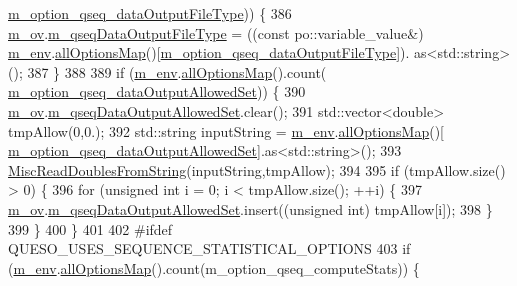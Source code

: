 \begin{DoxyCode}
      \hyperlink{class_q_u_e_s_o_1_1_monte_carlo_s_g_options_a7e07046865a2e99b61ac30b94dfc8306}{m\_option\_qseq\_dataOutputFileType})) \{
386     \hyperlink{class_q_u_e_s_o_1_1_monte_carlo_s_g_options_a4bc6849a41ede87425cad9ab6e97df11}{m\_ov}.\hyperlink{class_q_u_e_s_o_1_1_mc_options_values_a4816ea4c0aef22cc5d2e9057ea44b73e}{m\_qseqDataOutputFileType} = ((\textcolor{keyword}{const} po::variable\_value&) 
      \hyperlink{class_q_u_e_s_o_1_1_monte_carlo_s_g_options_a16b93142f6a249ccf1d07de964fec2ef}{m\_env}.\hyperlink{class_q_u_e_s_o_1_1_base_environment_ae7cee155956e0e70112f45e2ad1f02c8}{allOptionsMap}()[\hyperlink{class_q_u_e_s_o_1_1_monte_carlo_s_g_options_a7e07046865a2e99b61ac30b94dfc8306}{m\_option\_qseq\_dataOutputFileType}]).
      as<std::string>();
387   \}
388 
389   \textcolor{keywordflow}{if} (\hyperlink{class_q_u_e_s_o_1_1_monte_carlo_s_g_options_a16b93142f6a249ccf1d07de964fec2ef}{m\_env}.\hyperlink{class_q_u_e_s_o_1_1_base_environment_ae7cee155956e0e70112f45e2ad1f02c8}{allOptionsMap}().count(
      \hyperlink{class_q_u_e_s_o_1_1_monte_carlo_s_g_options_a2d464d948dabe4fd9fbd1e912537b3e0}{m\_option\_qseq\_dataOutputAllowedSet})) \{
390     \hyperlink{class_q_u_e_s_o_1_1_monte_carlo_s_g_options_a4bc6849a41ede87425cad9ab6e97df11}{m\_ov}.\hyperlink{class_q_u_e_s_o_1_1_mc_options_values_a15671d02e2a6fa2052361dde6342e263}{m\_qseqDataOutputAllowedSet}.clear();
391     std::vector<double> tmpAllow(0,0.);
392     std::string inputString = \hyperlink{class_q_u_e_s_o_1_1_monte_carlo_s_g_options_a16b93142f6a249ccf1d07de964fec2ef}{m\_env}.\hyperlink{class_q_u_e_s_o_1_1_base_environment_ae7cee155956e0e70112f45e2ad1f02c8}{allOptionsMap}()[
      \hyperlink{class_q_u_e_s_o_1_1_monte_carlo_s_g_options_a2d464d948dabe4fd9fbd1e912537b3e0}{m\_option\_qseq\_dataOutputAllowedSet}].as<std::string>();
393     \hyperlink{namespace_q_u_e_s_o_ac3fab438679d1dc864f8d629881dad2e}{MiscReadDoublesFromString}(inputString,tmpAllow);
394 
395     \textcolor{keywordflow}{if} (tmpAllow.size() > 0) \{
396       \textcolor{keywordflow}{for} (\textcolor{keywordtype}{unsigned} \textcolor{keywordtype}{int} i = 0; i < tmpAllow.size(); ++i) \{
397         \hyperlink{class_q_u_e_s_o_1_1_monte_carlo_s_g_options_a4bc6849a41ede87425cad9ab6e97df11}{m\_ov}.\hyperlink{class_q_u_e_s_o_1_1_mc_options_values_a15671d02e2a6fa2052361dde6342e263}{m\_qseqDataOutputAllowedSet}.insert((\textcolor{keywordtype}{unsigned} \textcolor{keywordtype}{int}) tmpAllow[i]);
398       \}
399     \}
400   \}
401 
402 \textcolor{preprocessor}{#ifdef QUESO\_USES\_SEQUENCE\_STATISTICAL\_OPTIONS}
403 \textcolor{preprocessor}{}  \textcolor{keywordflow}{if} (\hyperlink{class_q_u_e_s_o_1_1_monte_carlo_s_g_options_a16b93142f6a249ccf1d07de964fec2ef}{m\_env}.\hyperlink{class_q_u_e_s_o_1_1_base_environment_ae7cee155956e0e70112f45e2ad1f02c8}{allOptionsMap}().count(m\_option\_qseq\_computeStats)) \{

\end{DoxyCode}
